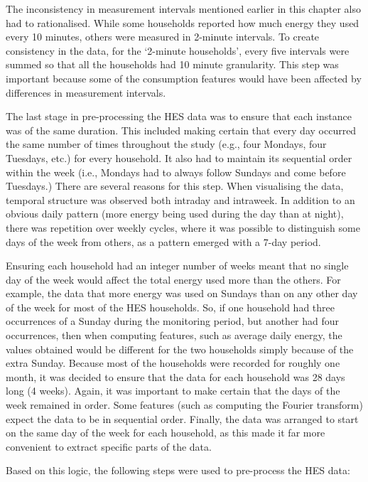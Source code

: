 The inconsistency in measurement intervals mentioned earlier in this chapter also had to rationalised. While some households reported how much energy they used every 10 minutes, others were measured in 2-minute intervals. To create consistency in the data, for the `2-minute households', every five intervals were summed so that all the households had 10 minute granularity. This step was important because some of the consumption features would have been affected by differences in measurement intervals. 

The last stage in pre-processing the HES data was to ensure that each instance was of the same duration.  This included making certain that every day occurred the same number of times throughout the study (e.g., four Mondays, four Tuesdays, etc.) for every household.  It also had to maintain its sequential order within the week (i.e., Mondays had to always follow Sundays and come before Tuesdays.)  There are several reasons for this step.  When visualising the data, temporal structure was observed both intraday and intraweek. In addition to an obvious daily pattern (more energy being used during the day than at night), there was repetition over weekly cycles, where it was possible to distinguish some days of the week from others, as a pattern emerged with a 7-day period.  

Ensuring each household had an integer number of weeks meant that no single day of the week would affect the total energy used more than the others. For example, the data that more energy was used on Sundays than on any other day of the week for most of the HES households. So, if one household had three occurrences of a Sunday during the monitoring period, but another had four occurrences, then when computing features, such as average daily energy, the values obtained would be different for the two households simply because of the extra Sunday. Because most of the households were recorded for roughly one month, it was decided to ensure that the data for each household was 28 days long (4 weeks). Again, it was important to make certain that the days of the week remained in order. Some features  (such as computing the Fourier transform) expect the data to be in sequential order. Finally, the data was arranged to start on the same day of the week for each household, as this made it far more convenient to extract specific parts of the data.

Based on this logic, the following steps were used to pre-process the HES data:

